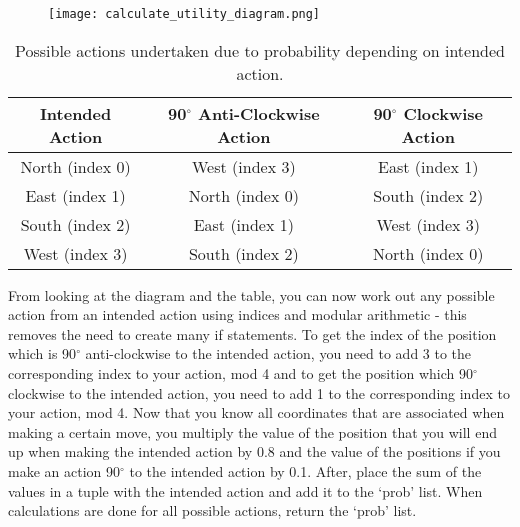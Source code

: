\documentclass[12pt]{report}
\begin{document}
        \begin{figure}[H]
          \centering
          \texttt{[image: calculate\_utility\_diagram.png]}
        \end{figure}
        \begin{table}[H]
          \begin{center}
            \begin{tabular}{c|c|c}
              \textbf{Intended Action} & \textbf{90$^{\circ}$ Anti-Clockwise Action} & \textbf{90$^{\circ}$ Clockwise Action}\\
              \hline
              North (index 0) & West (index 3) & East (index 1)\\
              East (index 1) & North (index 0) & South (index 2)\\
              South (index 2) & East (index 1) & West (index 3)\\
              West (index 3) & South (index 2) & North (index 0)\\
            \end{tabular}
            \caption{Possible actions undertaken due to probability depending on intended action.}
            \label{tab:table1}
          \end{center}
        \end{table}
        \vspace{-5mm}
        From looking at the diagram and the table, you can now work out any possible action from an intended action using indices and modular arithmetic - this removes the need to create many if statements. To get the index of the position which is 90$^{\circ}$ anti-clockwise to the intended action, you need to add 3 to the corresponding index to your action, mod 4 and to get the position which 90$^{\circ}$ clockwise to the intended action, you need to add 1 to the corresponding index to your action, mod 4.
        \newline \newline
        Now that you know all coordinates that are associated when making a certain move, you multiply the value of the position that you will end up when making the intended action by 0.8 and the value of the positions if you make an action 90$^{\circ}$ to the intended action by 0.1. After, place the sum of the values in a tuple with the intended action and add it to the `prob' list. When calculations are done for all possible actions, return the `prob' list.
        \newline \newline
\end{document}
